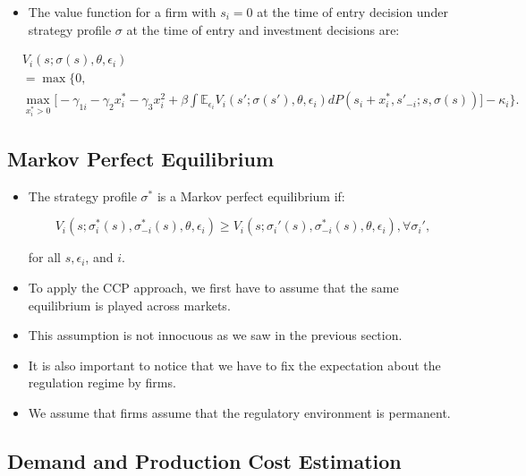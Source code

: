 \documentclass[]{book}
\providecommand{\tightlist}{%
  \setlength{\itemsep}{0pt}\setlength{\parskip}{0pt}}
\begin{document}
\begin{itemize}
\tightlist
\item
  The value function for a firm with \(s_i = 0\) at the time of entry
  decision under strategy profile \(\sigma\) at the time of entry and
  investment decisions are:
\end{itemize}

\begin{equation}
\begin{split}
&V_i(s; \sigma(s), \theta, \epsilon_i)\\
&=\max\Bigg\{0, \\
&\max_{x_i^* > 0} \Bigg[ - \gamma_{1i} - \gamma_2 x_i^* - \gamma_3 x_i^2 + \beta \int \mathbb{E}_{\epsilon_i} V_i(s'; \sigma(s'), \theta, \epsilon_i) dP(s_i + x_i^*, s'_{-i}; s, \sigma(s))\Bigg] - \kappa_i\Bigg\}.
\end{split}
\end{equation}

\subsection{Markov Perfect
Equilibrium}\label{markov-perfect-equilibrium-1}

\begin{itemize}
\tightlist
\item
  The strategy profile \(\sigma^*\) is a Markov perfect equilibrium if:

  \begin{equation}
  V_i(s; \sigma_i^*(s), \sigma_{-i}^*(s), \theta, \epsilon_i) \ge V_i(s; \sigma_i'(s), \sigma_{-i}^*(s), \theta, \epsilon_i), \forall \sigma_i',
  \end{equation}

  for all \(s, \epsilon_i\), and \(i\).
\item
  To apply the CCP approach, we first have to assume that the same
  equilibrium is played across markets.
\item
  This assumption is not innocuous as we saw in the previous section.
\item
  It is also important to notice that we have to fix the expectation
  about the regulation regime by firms.
\item
  We assume that firms assume that the regulatory environment is
  permanent.
\end{itemize}

\subsection{Demand and Production Cost
Estimation}\label{demand-and-production-cost-estimation}
\end{document}

